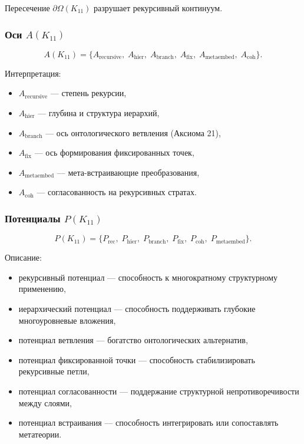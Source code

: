 Пересечение $\partial\Omega(K_{11})$ разрушает рекурсивный континуум.

\subsubsection{Оси $A(K_{11})$}

\[
A(K_{11}) =
\{
A_{\mathrm{recursive}},\;
A_{\mathrm{hier}},\;
A_{\mathrm{branch}},\;
A_{\mathrm{fix}},\;
A_{\mathrm{metaembed}},\;
A_{\mathrm{coh}}
\}.
\]

Интерпретация:
\begin{itemize}
    \item $A_{\mathrm{recursive}}$ — степень рекурсии,
    \item $A_{\mathrm{hier}}$ — глубина и структура иерархий,
    \item $A_{\mathrm{branch}}$ — ось онтологического ветвления (Аксиома 21),
    \item $A_{\mathrm{fix}}$ — ось формирования фиксированных точек,
    \item $A_{\mathrm{metaembed}}$ — мета-встраивающие преобразования,
    \item $A_{\mathrm{coh}}$ — согласованность на рекурсивных стратах.
\end{itemize}

\subsubsection{Потенциалы $P(K_{11})$}

\[
P(K_{11})=
\{
P_{\mathrm{rec}},\;
P_{\mathrm{hier}},\;
P_{\mathrm{branch}},\;
P_{\mathrm{fix}},\;
P_{\mathrm{coh}},\;
P_{\mathrm{metaembed}}
\}.
\]

Описание:
\begin{itemize}
    \item рекурсивный потенциал — способность к многократному структурному применению,
    \item иерархический потенциал — способность поддерживать глубокие многоуровневые вложения,
    \item потенциал ветвления — богатство онтологических альтернатив,
    \item потенциал фиксированной точки — способность стабилизировать рекурсивные петли,
    \item потенциал согласованности — поддержание структурной непротиворечивости между слоями,
    \item потенциал встраивания — способность интегрировать или сопоставлять метатеории.
\end{itemize}

